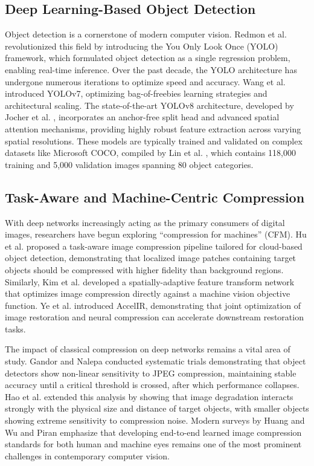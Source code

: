 \documentclass[12pt, a4paper]{article}
\begin{document}
\subsection{Deep Learning-Based Object Detection}
Object detection is a cornerstone of modern computer vision. Redmon et al. \cite{redmon2016} revolutionized this field by introducing the You Only Look Once (YOLO) framework, which formulated object detection as a single regression problem, enabling real-time inference. Over the past decade, the YOLO architecture has undergone numerous iterations to optimize speed and accuracy. Wang et al. \cite{wang2023} introduced YOLOv7, optimizing bag-of-freebies learning strategies and architectural scaling. The state-of-the-art YOLOv8 architecture, developed by Jocher et al. \cite{jocher2023}, incorporates an anchor-free split head and advanced spatial attention mechanisms, providing highly robust feature extraction across varying spatial resolutions. These models are typically trained and validated on complex datasets like Microsoft COCO, compiled by Lin et al. \cite{lin2014}, which contains 118,000 training and 5,000 validation images spanning 80 object categories.

\subsection{Task-Aware and Machine-Centric Compression}
With deep networks increasingly acting as the primary consumers of digital images, researchers have begun exploring ``compression for machines'' (CFM). Hu et al. \cite{hu2018} proposed a task-aware image compression pipeline tailored for cloud-based object detection, demonstrating that localized image patches containing target objects should be compressed with higher fidelity than background regions. Similarly, Kim et al. \cite{kim2021} developed a spatially-adaptive feature transform network that optimizes image compression directly against a machine vision objective function. Ye et al. \cite{ye2023} introduced AccelIR, demonstrating that joint optimization of image restoration and neural compression can accelerate downstream restoration tasks.

The impact of classical compression on deep networks remains a vital area of study. Gandor and Nalepa \cite{gandor2022} conducted systematic trials demonstrating that object detectors show non-linear sensitivity to JPEG compression, maintaining stable accuracy until a critical threshold is crossed, after which performance collapses. Hao et al. \cite{hao2022} extended this analysis by showing that image degradation interacts strongly with the physical size and distance of target objects, with smaller objects showing extreme sensitivity to compression noise. Modern surveys by Huang and Wu \cite{huang2024} and Piran \cite{piran2022} emphasize that developing end-to-end learned image compression standards for both human and machine eyes remains one of the most prominent challenges in contemporary computer vision.
\end{document}
